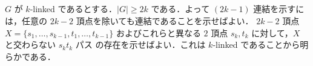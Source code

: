 \subsection{}
$G$ が $k$-linked であるとする．$|G|\geq 2k$ である．よって $(2k-1)$ 連結を示すには，任意の $2k-2$ 頂点を除いても連結であることを示せばよい．
$2k-2$ 頂点 $X = \{s_1,\ldots,s_{k-1}, t_1,\ldots, t_{k-1}\}$ およびこれらと異なる $2$ 頂点 $s_k, t_k$ に対して，$X$ と交わらない $s_kt_k$ パス
の存在を示せばよい．これは $k$-linked であることから明らかである．